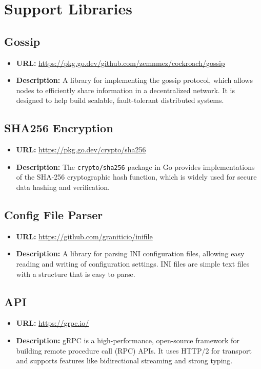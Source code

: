 \section{Support Libraries}
\subsection*{Gossip}
\begin{itemize}
    \item \textbf{URL:} \url{https://pkg.go.dev/github.com/zemnmez/cockroach/gossip}
    \item \textbf{Description:} A library for implementing the gossip protocol, which allows nodes to efficiently share information in a decentralized network. It is designed to help build scalable, fault-tolerant distributed systems.
\end{itemize}

\subsection*{SHA256 Encryption}
\begin{itemize}
    \item \textbf{URL:} \url{https://pkg.go.dev/crypto/sha256}
    \item \textbf{Description:} The \texttt{crypto/sha256} package in Go provides implementations of the SHA-256 cryptographic hash function, which is widely used for secure data hashing and verification.
\end{itemize}

\subsection*{Config File Parser}
\begin{itemize}
    \item \textbf{URL:} \url{https://github.com/graniticio/inifile}
    \item \textbf{Description:} A library for parsing INI configuration files, allowing easy reading and writing of configuration settings. INI files are simple text files with a structure that is easy to parse.
\end{itemize}

\subsection*{API}
\begin{itemize}
    \item \textbf{URL:} \url{https://grpc.io/}
    \item \textbf{Description:} gRPC is a high-performance, open-source framework for building remote procedure call (RPC) APIs. It uses HTTP/2 for transport and supports features like bidirectional streaming and strong typing.
\end{itemize}

